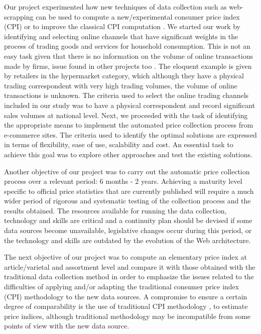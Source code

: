 \documentclass[]{article}
\begin{document}
Our project experimented how new techniques of data collection such as web-scrapping can be used to compute a new/experimental 
consumer price index (CPI) or to improve the classical CPI computation \cite{otawa2017}. We started our work by identifying and 
selecting online channels that have significant weights in the process of trading goods and services for household consumption. 
This is not an easy task given that there is no information on the volume of online transactions made by firms, 
issue found in other projects too \cite{willenborg2017}. The eloquent 
example is given by retailers in the hypermarket category, which although they have a physical trading correspondent with very high 
trading volumes, the volume of online transactions is unknown. The criteria used to select the online trading channels included in 
our study was to have a physical correspondent and record significant sales volumes at national level. Next, we proceeded with the 
task of identifying the appropriate means to implement the automated price collection process from e-commerce sites. The criteria 
used to identify the optimal solutions are expressed in terms of flexibility, ease of use, scalability and cost. An essential task 
to achieve this goal was to explore other approaches and test the existing solutions. 


Another objective of our project was to carry out the automatic price collection process over a relevant period: 6 months - 2 years. 
Achieving a maturity level specific to official price statistics that are currently published will require a much wider period of 
rigorous and systematic testing of the collection process and the results obtained. The resources available for running the data 
collection, technology and skills are critical and a continuity plan should be devised if some data sources become unavailable, 
legislative changes occur during this period, or the technology and skills are outdated by the evolution of the Web architecture. 


The next objective of our project was to compute an elementary price index at article/varietal and assortment level and compare 
it with those obtained with the traditional data collection method in order to emphasize the issues related to the difficulties 
of applying and/or adapting the traditional consumer price index (CPI) methodology \cite{cpi} to the new data sources.  A compromise to 
ensure a certain degree of comparability is the use of traditional CPI methodology \cite{cpi2}, \cite{cpi3} to estimate price indices, although 
traditional methodology may be incompatible from some points of view with the new data source. 
\end{document}
